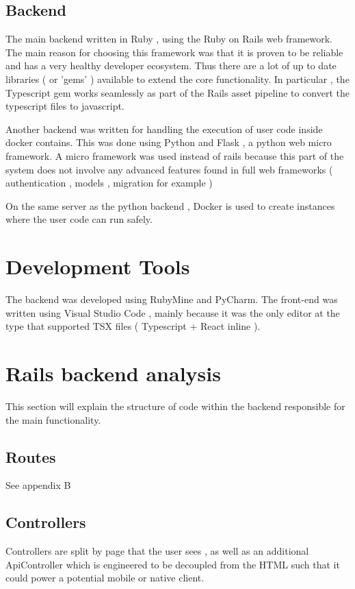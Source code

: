 \subsection{Backend} 
The main backend written in Ruby , using the Ruby on Rails web framework. The main reason for choosing this framework was that it is proven to be reliable and has a very healthy developer ecosystem. Thus there are a lot of up to date libraries ( or 'gems' ) available to extend the core functionality. In particular , the Typescript gem works seamlessly as part of the Rails asset pipeline to convert the typescript files to javascript.

Another backend was written for handling the execution of user code inside docker contains. This was done using Python and Flask , a python web micro framework. A micro framework was used instead of rails because this part of the system does not involve any advanced features found in full web frameworks ( authentication , models , migration for example )

On the same server as the python backend , Docker is used to create instances where the user code can run safely.

\section{Development Tools}
The backend was developed using RubyMine and PyCharm.
The front-end was written using Visual Studio Code , mainly because it was the only editor at the type that supported TSX files ( Typescript + React inline ).


\section{Rails backend analysis}
This section will explain the structure of code within the backend responsible for the main functionality.

\subsection{Routes}
See appendix B

\subsection{Controllers}
Controllers are split by page that the user sees , as well as an additional ApiController which is engineered to be decoupled from the HTML such that it could power a potential mobile or native client.

